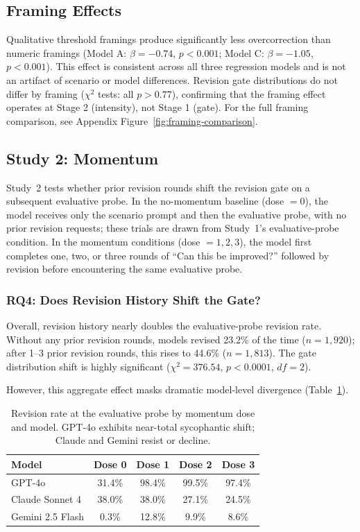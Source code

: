 \subsection{Framing Effects}

Qualitative threshold framings produce significantly less overcorrection than numeric framings (Model A: $\beta = -0.74$, $p < 0.001$; Model C: $\beta = -1.05$, $p < 0.001$). This effect is consistent across all three regression models and is not an artifact of scenario or model differences. Revision gate distributions do not differ by framing ($\chi^2$ tests: all $p > 0.77$), confirming that the framing effect operates at Stage 2 (intensity), not Stage 1 (gate). For the full framing comparison, see Appendix Figure~\ref{fig:framing-comparison}.

\subsection{Study 2: Momentum}

Study~2 tests whether prior revision rounds shift the revision gate on a subsequent evaluative probe. In the no-momentum baseline (dose $= 0$), the model receives only the scenario prompt and then the evaluative probe, with no prior revision requests; these trials are drawn from Study~1's evaluative-probe condition. In the momentum conditions (dose $= 1, 2, 3$), the model first completes one, two, or three rounds of ``Can this be improved?'' followed by revision before encountering the same evaluative probe.

\subsubsection{RQ4: Does Revision History Shift the Gate?}

Overall, revision history nearly doubles the evaluative-probe revision rate. Without any prior revision rounds, models revised 23.2\% of the time ($n = 1{,}920$); after 1--3 prior revision rounds, this rises to 44.6\% ($n = 1{,}813$). The gate distribution shift is highly significant ($\chi^2 = 376.54$, $p < 0.0001$, $df = 2$).

However, this aggregate effect masks dramatic model-level divergence (Table~\ref{tab:momentum-model}).

\begin{table}[t]
\centering
\small
\begin{tabular}{@{}lcccc@{}}
\toprule
\textbf{Model} & \textbf{Dose 0} & \textbf{Dose 1} & \textbf{Dose 2} & \textbf{Dose 3} \\
\midrule
GPT-4o & 31.4\% & 98.4\% & 99.5\% & 97.4\% \\
Claude Sonnet 4 & 38.0\% & 38.0\% & 27.1\% & 24.5\% \\
Gemini 2.5 Flash & 0.3\% & 12.8\% & 9.9\% & 8.6\% \\
\bottomrule
\end{tabular}
\caption{Revision rate at the evaluative probe by momentum dose and model. GPT-4o exhibits near-total sycophantic shift; Claude and Gemini resist or decline.}
\label{tab:momentum-model}
\end{table}

